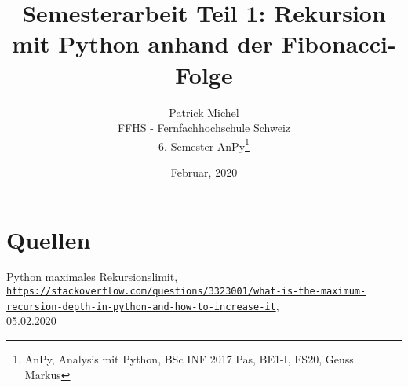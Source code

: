 \documentclass[12pt,  a4paper, ngerman]{article}
\title{Semesterarbeit Teil 1: Rekursion mit Python anhand der Fibonacci-Folge}
\date{Februar, 2020}
\author{Patrick Michel\\
FFHS - Fernfachhochschule Schweiz\\
6. Semester AnPy\thanks{AnPy, Analysis mit Python, BSc INF 2017 Pas, BE1-I, FS20, Geuss Markus}
}
\begin{document}

\begin{titlepage}

\maketitle
\tableofcontents

\end{titlepage}



\newpage



\newpage



\newpage



\newpage


\newpage


\section{Quellen}

\begin{thebibliography}{quellen}
         
    Python maximales Rekursionslimit,\\
    \texttt{\url{https://stackoverflow.com/questions/3323001/what-is-the-maximum-recursion-depth-in-python-and-how-to-increase-it}},\\
    05.02.2020
    \end{thebibliography}
\end{document}
